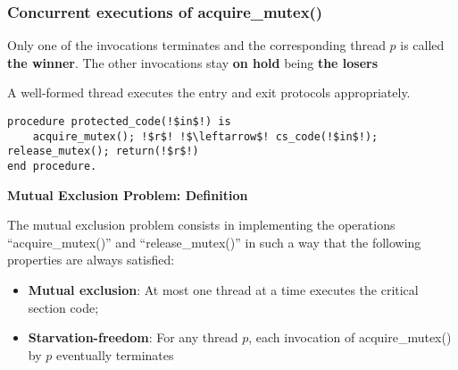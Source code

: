 \subsubsection{Concurrent executions of acquire\_mutex()}
\par Only one of the invocations terminates and the corresponding thread $p$ is called \textbf{the winner}. The other invocations stay \textbf{on hold} being \textbf{the losers}
\par A well-formed thread executes the entry and exit protocols appropriately.
\begin{tcolorbox}[colback=nightblue!5!white, colframe=nightblue!75!black]
    \begin{lstlisting}[label={lst:mutex1}, morekeywords={is, if, then, else, end, procedure}, numbers=none, escapechar=!]
procedure protected_code(!$in$!) is
    acquire_mutex(); !$r$! !$\leftarrow$! cs_code(!$in$!); release_mutex(); return(!$r$!)
end procedure.\end{lstlisting}
\end{tcolorbox}
\par {\large \textbf{Mutual Exclusion Problem: Definition}}
\par The mutual exclusion problem consists in implementing the operations “acquire\_mutex()” and “release\_mutex()” in such a way that the following properties are always satisfied:
\begin{itemize}
    \item \textbf{Mutual exclusion}: At most one thread at a time executes the critical section code;
    \item \textbf{Starvation-freedom}: For any thread $p$, each invocation of acquire\_mutex() by $p$ eventually terminates
\end{itemize}
